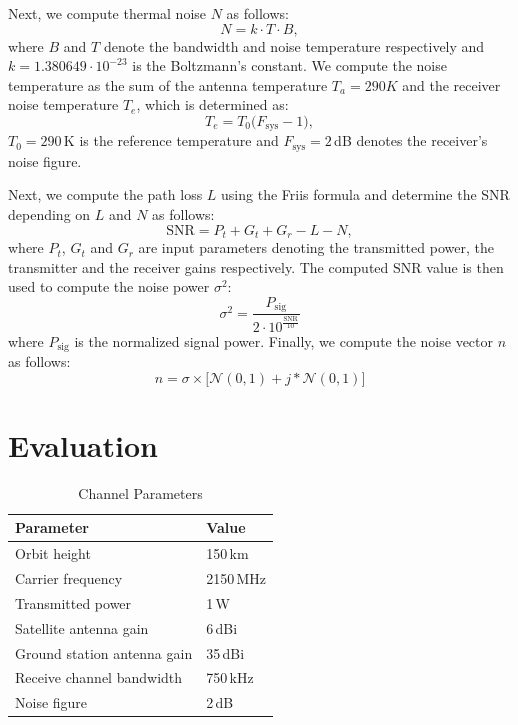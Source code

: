 \documentclass[conference]{IEEEtran}
\begin{document}
Next, we compute thermal noise $N$ as follows:
%
\begin{equation}
  N=k \cdot T \cdot B,
\end{equation}
%
where $B$ and $T$ denote the bandwidth and noise temperature respectively and $k = 1.380649 \cdot 10^{-23}$ is the Boltzmann's constant.
We compute the noise temperature as the sum of the antenna temperature $T_a = 290 K$ and the receiver noise temperature $T_e$, which is determined as:
%
\begin{equation}
  T_e = T_0 \big(F_{\mathrm{sys}} - 1 \big),
\end{equation}
%
$T_0 = 290$\,K is the reference temperature and $F_{\textrm{sys}} = 2$\,dB denotes the receiver's noise figure.

Next, we compute the path loss $L$ using the Friis formula and determine the SNR depending on $L$ and $N$ as follows:
%
\begin{equation}
  \mathrm{SNR} = P_t + G_t + G_r - L - N,
\end{equation}
%
where $P_t$, $G_t$ and $G_r$ are input parameters denoting the transmitted power, the transmitter and the receiver gains respectively. 
The computed $\mathrm{SNR}$ value is then used to compute the noise power $\sigma^2$:
%
\begin{equation}
  \sigma^2 = \frac{P_{\mathrm{sig}}}{2 \cdot 10^{\frac{\mathrm{SNR}}{10}}}
\end{equation}
%
where $P_{\mathrm{sig}}$ is the normalized signal power.
Finally, we compute the noise vector $n$ as follows:
%
\begin{equation}
  n = \sigma \times \bigl[\mathcal{N}(0,1) + j * \mathcal{N}(0,1) \bigr] 
\end{equation}
%


\section{Evaluation}
\label{sec:evaluation}

\begin{table}
  \caption{Channel Parameters}
  \label{tab:channel_parameters}

  \centering
	\begin{tabular}{ll}
		\toprule
    Parameter & Value \\
    \midrule
		Orbit height & 150\,km \\
		Carrier frequency & 2150\,MHz \\
    Transmitted power & 1\,W \\
    Satellite antenna gain & 6\,dBi \\
    Ground station antenna gain & 35\,dBi \\
		Receive channel bandwidth & 750\,kHz \\
		Noise figure & 2\,dB \\
		\bottomrule
	\end{tabular}
\end{table}
\end{document}
